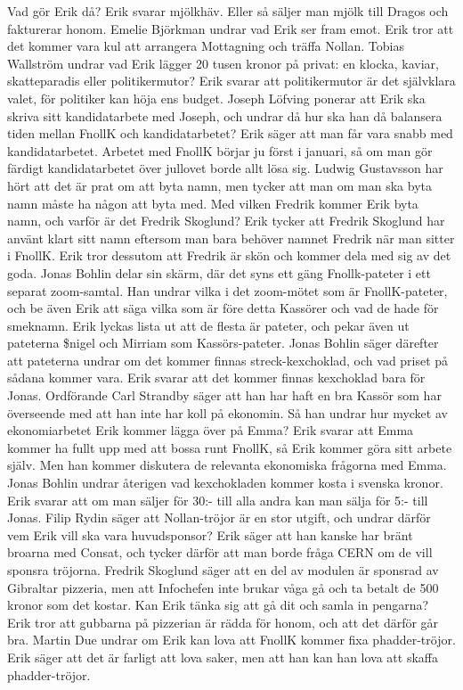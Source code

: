 \documentclass[hidelinks]{sektionsmote} %
\begin{document}
Vad gör Erik då?
Erik svarar mjölkhäv.
Eller så säljer man mjölk till Dragos och fakturerar honom.
Emelie Björkman undrar vad Erik ser fram emot.
Erik tror att det kommer vara kul att arrangera Mottagning och träffa Nollan.
Tobias Wallström undrar vad Erik lägger 20 tusen kronor på privat: en klocka, kaviar, skatteparadis eller politikermutor?
Erik svarar att politikermutor är det självklara valet, för politiker kan höja ens budget.
Joseph Löfving ponerar att Erik ska skriva sitt kandidatarbete med Joseph, och undrar då hur ska han då balansera tiden mellan FnollK och kandidatarbetet?
Erik säger att man får vara snabb med kandidatarbetet.
Arbetet med FnollK börjar ju först i januari, så om man gör färdigt kandidatarbetet över jullovet borde allt lösa sig.
Ludwig Gustavsson har hört att det är prat om att byta namn, men tycker att man om man ska byta namn måste ha någon att byta med.
Med vilken Fredrik kommer Erik byta namn, och varför är det Fredrik Skoglund?
Erik tycker att Fredrik Skoglund har använt klart sitt namn eftersom man bara behöver namnet Fredrik när man sitter i FnollK.
Erik tror dessutom att Fredrik är skön och kommer dela med sig av det goda.
Jonas Bohlin delar sin skärm, där det syns ett gäng Fnollk-pateter i ett separat zoom-samtal.
Han undrar vilka i det zoom-mötet som är FnollK-pateter, och be även Erik att säga vilka som är före detta Kassörer och vad de hade för smeknamn.
Erik lyckas lista ut att de flesta är pateter, och pekar även ut pateterna \$nigel och Mirriam som Kassörs-pateter.
Jonas Bohlin säger därefter att pateterna undrar om det kommer finnas streck-kexchoklad, och vad priset på sådana kommer vara.
Erik svarar att det kommer finnas kexchoklad bara för Jonas.
Ordförande Carl Strandby säger att han har haft en bra Kassör som har överseende med att han inte har koll på ekonomin.
Så han undrar hur mycket av ekonomiarbetet Erik kommer lägga över på Emma?
Erik svarar att Emma kommer ha fullt upp med att bossa runt FnollK, så Erik kommer göra sitt arbete själv.
Men han kommer diskutera de relevanta ekonomiska frågorna med Emma.
Jonas Bohlin undrar återigen vad kexchokladen kommer kosta i svenska kronor.
Erik svarar att om man säljer för 30:- till alla andra kan man sälja för 5:- till Jonas.
Filip Rydin säger att Nollan-tröjor är en stor utgift, och undrar därför vem Erik vill ska vara huvudsponsor?
Erik säger att han kanske har bränt broarna med Consat, och tycker därför att man borde fråga CERN om de vill sponsra tröjorna.
Fredrik Skoglund säger att en del av modulen är sponsrad av Gibraltar pizzeria, men att Infochefen inte brukar våga gå och ta betalt de 500 kronor som det kostar.
Kan Erik tänka sig att gå dit och samla in pengarna?
Erik tror att gubbarna på pizzerian är rädda för honom, och att det därför går bra.
Martin Due undrar om Erik kan lova att FnollK kommer fixa phadder-tröjor.
Erik säger att det är farligt att lova saker, men att han kan han lova att skaffa phadder-tröjor.
\end{document}
